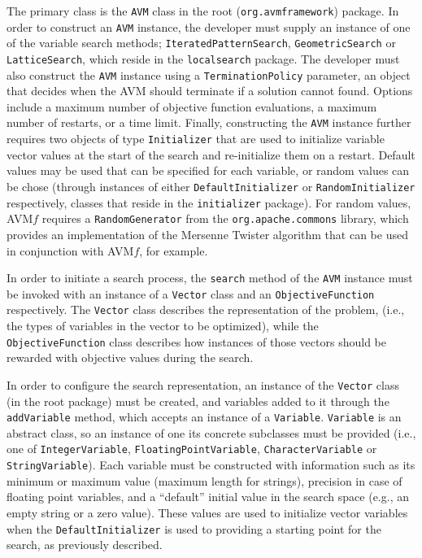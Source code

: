 \documentclass{llncs}
\newcommand{\name}{AVM\hspace{-1pt}$f$\xspace}
\newcommand{\inlineheading}[1]{\vspace{1mm} \noindent {\bf #1.}}
\begin{document}
\begin{sloppypar}
\inlineheading{Configuring an AVM search} The primary class is the {\tt AVM} class in the root ({\tt org.avmframework}) package. In order to construct an {\tt AVM} instance, the developer must supply an instance of one of the variable search methods; {\tt IteratedPatternSearch}, {\tt GeometricSearch} or {\tt LatticeSearch}, which reside in the {\tt localsearch} package. The developer must also construct the {\tt AVM} instance using a {\tt TerminationPolicy} parameter, an object that decides when the AVM should terminate if a solution cannot found. Options include a maximum number of objective function evaluations, a maximum number of restarts, or a time limit. Finally, constructing the {\tt AVM} instance further requires two objects of type {\tt Initializer} that are used to initialize variable vector values at the start of the search and re-initialize them on a restart. Default values may be used that can be specified for each variable, or random values can be chose (through instances of either {\tt DefaultInitializer} or {\tt RandomInitializer} respectively, classes that reside in the {\tt initializer} package). For random values, \name requires a {\tt RandomGenerator} from the {\tt org.apache.commons} library, which provides an implementation of the Mersenne Twister algorithm that can be used in conjunction with \name, for example.
\end{sloppypar}

\begin{sloppypar}
In order to initiate a search process, the {\tt search} method of the {\tt AVM} instance must be invoked with an instance of a {\tt Vector} class and an {\tt ObjectiveFunction} respectively. The {\tt Vector} class describes the representation of the problem,
(i.e., the types of variables in the vector to be optimized), while the {\tt ObjectiveFunction} class describes how instances of those vectors should be rewarded with objective values during the search.
\end{sloppypar}

\begin{sloppypar}
\inlineheading{Representation} In order to configure the search representation, an instance of the {\tt Vector} class (in the root package) must be created, and variables added to it through the {\tt addVariable} method, which accepts an instance of a {\tt Variable}. {\tt Variable} is an abstract class, so an instance of one its concrete subclasses must be provided (i.e., one of {\tt IntegerVariable}, {\tt FloatingPointVariable}, {\tt CharacterVariable} or {\tt StringVariable}). Each variable must be constructed with information such as its minimum or maximum value (maximum length for strings), precision in case of floating point variables, and a ``default'' initial value in the search space (e.g., an empty string or a zero value). These values are used to initialize vector variables when the {\tt DefaultInitializer} is used to providing a starting point for the search, as previously described.
\end{sloppypar}
\end{document}
